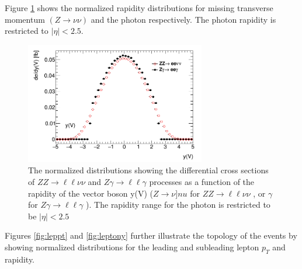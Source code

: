 \documentclass[11pt,a4paper,openright,twoside]{report}
\newcommand{\ZZ}{$ZZ\to \ell\ell\nu\nu$ }
\newcommand{\Zg}{$Z\gamma\to \ell\ell\gamma$ }
\begin{document}
Figure \ref{fig:yy} shows the normalized rapidity distributions for missing transverse momentum $(Z\to\nu\nu)$ and the photon respectively. The photon rapidity is restricted to $|\eta|<2.5$.
\begin{figure}[H]
\centering
	\includegraphics[width=0.7\textwidth]{yy.png}
	\caption{The normalized distributions showing the differential cross sections of \ZZ and \Zg processes as a function of the rapidity of the vector boson y(V) ($Z\to\nu]nu$ for \ZZ, or $\gamma$ for \Zg). The rapidity range for the photon is restricted to be $|\eta|<2.5$}
	\label{fig:yy}
\end{figure}
Figures \ref{fig:leppt} and \ref{fig:leptony} further illustrate the topology of the events by showing normalized distributions for the leading and subleading lepton $p_T$ and rapidity.
\end{document}
